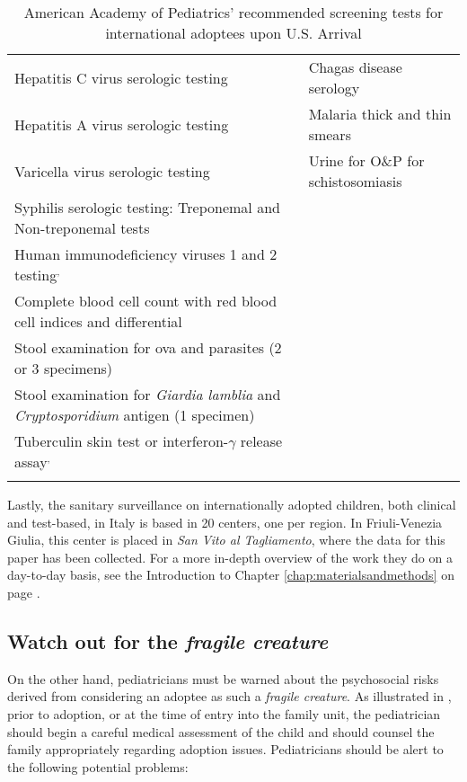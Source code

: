 \begin{footnotesize}
\begin{longtable}{p{0.5\mylength} p{0.5\mylength}}
	      Hepatitis C virus serologic testing\footnotemark[3] & Chagas disease serology\\
	      Hepatitis A virus serologic testing & Malaria thick and thin smears\\
	      Varicella virus serologic testing & Urine for O\&P for schistosomiasis\footnotemark[4]\\
	      Syphilis serologic testing: Treponemal and Non-treponemal tests & \\
	      Human immunodeficiency viruses 1 and 2 testing\footnotemark[3]$^{,}$\footnotemark[5] & \\
	      Complete blood cell count with red blood cell indices and differential & \\
	      Stool examination for ova and parasites (2 or 3 specimens) & \\
	      Stool examination for \textit{Giardia lamblia} and \textit{Cryptosporidium} antigen (1 specimen) & \\
	      Tuberculin skin test or interferon-$\gamma$ release assay\footnotemark[3]$^{,}$\footnotemark[6] & \\
	   \caption{American Academy of Pediatrics' recommended screening tests for international adoptees upon U.S. Arrival}
	    \label{tab:AAPrecscreening}
	\end{longtable}
\end{footnotesize}


Lastly, the sanitary surveillance on internationally adopted children, both clinical and test-based, in Italy is based in 20 centers, one per region. In Friuli-Venezia Giulia, this center is placed in \textit{San Vito al Tagliamento}, where the data for this paper has been collected. For a more in-depth overview of the work they do on a day-to-day basis, see the Introduction to Chapter \ref{chap:materialsandmethods} on page \pageref{chap:materialsandmethods}.

\subsection{Watch out for the \textit{fragile creature}}
On the other hand, pediatricians must be warned about the psychosocial risks derived from considering an adoptee as such a \textit{fragile creature}. As illustrated in \cite{initialeval}, prior to adoption, or at the time of entry into the family unit, the pediatrician should begin a careful medical assessment of the child and should counsel the family appropriately regarding adoption issues. Pediatricians should be alert to the following potential problems:


